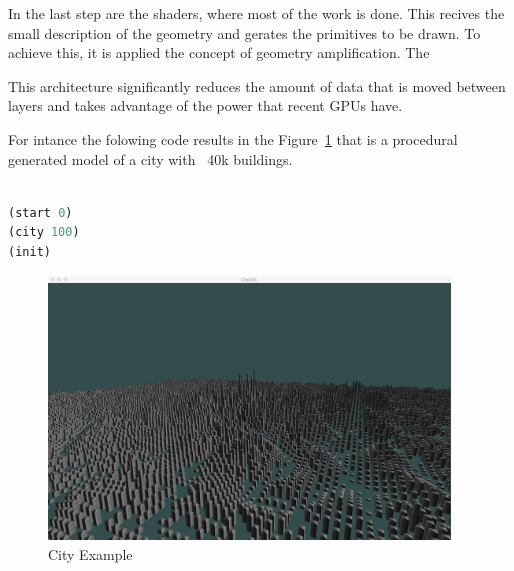 In the last step are the shaders, where most of the work is done. This recives the small description of the geometry and gerates the primitives to be drawn. To achieve this, it is applied the concept of geometry amplification. The 

This architecture significantly reduces the amount of data that is moved between layers and takes advantage of the power that recent GPUs have.

For intance the folowing code results in the Figure~\ref{fig:pic1} that is a procedural generated model of a city with ~40k buildings.


\begin{lstlisting}[frame=single,language=Lisp]  % Start your code-block

(start 0)
(city 100)
(init)
\end{lstlisting}

\begin{figure}[htb]
	\centering
	\includegraphics[width=0.95\textwidth]{img/Solution/City2-100*100.png}
	\caption{City Example}
	\label{fig:pic1}
\end{figure}



